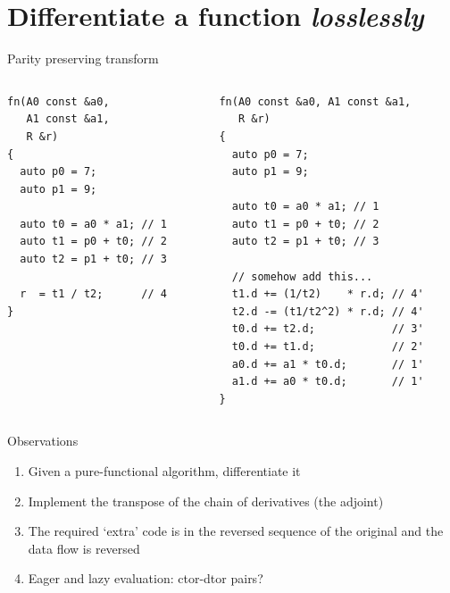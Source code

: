 \documentclass[xcolor=dvipsnames]{beamer}
\begin{document}
\section{Differentiate a function \protect\textit{losslessly}}

\begin{frame}[fragile]{Parity preserving transform}
  \begin{columns}[T] %
    \begin{column}{0.44\textwidth}
      {\color{gray}{write something like this \dots}}
      \begin{lstlisting}
fn(A0 const &a0,
   A1 const &a1,
   R &r)
{
  auto p0 = 7;
  auto p1 = 9;

  auto t0 = a0 * a1; // 1
  auto t1 = p0 + t0; // 2
  auto t2 = p1 + t0; // 3

  r  = t1 / t2;      // 4
}
  \end{lstlisting}
    \end{column}%
    \hfill%
    \begin{column}{0.56\textwidth}
      {\color{gray}{to implement something like this}}
        \begin{lstlisting}
fn(A0 const &a0, A1 const &a1,
   R &r)
{
  auto p0 = 7;
  auto p1 = 9;

  auto t0 = a0 * a1; // 1
  auto t1 = p0 + t0; // 2
  auto t2 = p1 + t0; // 3

  // somehow add this...
  t1.d += (1/t2)    * r.d; // 4'
  t2.d -= (t1/t2^2) * r.d; // 4'
  t0.d += t2.d;            // 3'
  t0.d += t1.d;            // 2'
  a0.d += a1 * t0.d;       // 1'
  a1.d += a0 * t0.d;       // 1'
}
  \end{lstlisting}
    \end{column}%
  \end{columns}
\end{frame}


\begin{frame}[fragile]{Observations}
  \begin{enumerate}
  \item Given a pure-functional algorithm, differentiate it \vspace{5mm}
  \item Implement the transpose of the chain of derivatives (the adjoint) \vspace{5mm}
  \item The required `extra' code is in the reversed sequence of the original and the data flow is reversed \vspace{5mm}
  \item Eager and lazy evaluation: ctor-dtor pairs? \vspace{5mm}
  \end{enumerate}
\end{frame}
\end{document}
